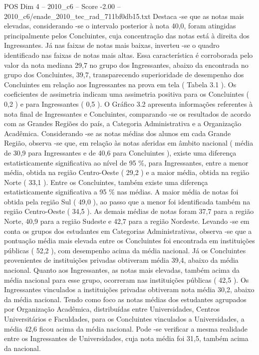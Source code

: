 \begin{textsample}{POS Dim 4 – 2010\_c6 – Score -2.00 – 2010\_c6/enade\_2010\_tec\_rad\_711bf0db15.txt}
Destaca -se que as notas mais elevadas, considerando -se o intervalo posterior à nota 40,0, foram atingidas principalmente pelos Concluintes, cuja concentração das notas está à direita dos Ingressantes.
Já nas faixas de notas mais baixas, inverteu -se o quadro identificado nas faixas de notas mais altas.
Essa característica é corroborada pelo valor da nota mediana 29,7 no grupo dos Ingressantes, abaixo da encontrada no grupo dos Concluintes, 39,7, transparecendo superioridade de desempenho dos Concluintes em relação aos Ingressantes na prova em tela ( Tabela 3.1 ).
Os coeficientes de assimetria indicam uma assimetria positiva para os Concluintes ( 0,2 ) e para Ingressantes ( 0,5 ).
O Gráfico 3.2 apresenta informações referentes à nota final de Ingressantes e Concluintes, comparando -se os resultados de acordo com as Grandes Regiões do país, a Categoria Administrativa e a Organização Acadêmica.
Considerando -se as notas médias dos alunos em cada Grande Região, observa -se que, em relação às notas aferidas em âmbito nacional ( média de 30,9 para Ingressantes e de 40,6 para Concluintes ), existe uma diferença estatisticamente significativa ao nível de 95 \%, para Ingressantes, entre a menor média, obtida na região Centro-Oeste ( 29,2 ) e a maior média, obtida na região Norte ( 33,1 ).
Entre os Concluintes, também existe uma diferença estatisticamente significativa a 95 \% nas médias.
A maior média de notas foi obtida pela região Sul ( 49,0 ), ao passo que a menor foi identificada também na região Centro-Oeste ( 34,5 ).
As demais médias de notas foram 37,7 para a região Norte, 40,9 para a região Sudeste e 42,7 para a região Nordeste.
Levando -se em conta os grupos dos estudantes em Categorias Administrativas, observa -se que a pontuação média mais elevada entre os Concluintes foi encontrada em instituições públicas ( 52,2 ), com desempenho acima da média nacional.
Já os Concluintes provenientes de instituições privadas obtiveram média 39,4, abaixo da média nacional.
Quanto aos Ingressantes, as notas mais elevadas, também acima da média nacional para esse grupo, ocorreram nas instituições públicas ( 42,5 ).
Os Ingressantes vinculados a instituições privadas obtiveram nota média 30,2, abaixo da média nacional.
Tendo como foco as notas médias dos estudantes agrupados por Organização Acadêmica, distribuídas entre Universidades, Centros Universitários e Faculdades, para os Concluintes vinculados a Universidades, a média 42,6 ficou acima da média nacional.
Pode -se verificar a mesma realidade entre os Ingressantes de Universidades, cuja nota média foi 31,5, também acima da nacional.

\end{textsample}
